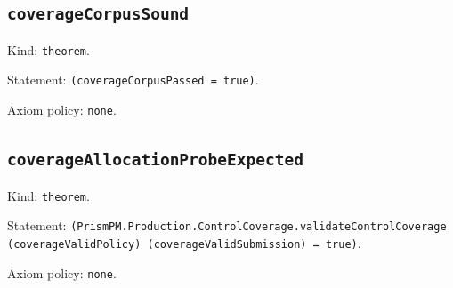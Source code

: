 \documentclass[11pt]{article}
\begin{document}
\subsection*{\texttt{coverageCorpusSound}}
\noindent Kind: \texttt{theorem}.\par
\noindent Statement: \texttt{(coverageCorpusPassed = true)}.\par
\noindent Axiom policy: \texttt{none}.\par
\subsection*{\texttt{coverageAllocationProbeExpected}}
\noindent Kind: \texttt{theorem}.\par
\noindent Statement: \texttt{(PrismPM.Production.ControlCoverage.validateControlCoverage (coverageValidPolicy) (coverageValidSubmission) = true)}.\par
\noindent Axiom policy: \texttt{none}.\par
\end{document}
